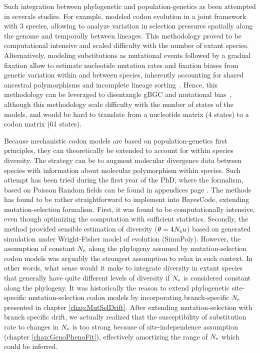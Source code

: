 Such integration between phylogenetic and population-genetics as been attempted in severals studies.
For example, \citet{Wilson2011} modeled codon evolution in a joint framework with $3$ species, allowing to analyze variation in selection pressures spatially along the genome and temporally between lineages.
This methodology proved to be computational intensive and scaled difficulty with the number of extant species.
Alternatively, modeling substitutions as mutational events followed by a gradual fixation allow to estimate nucleotide mutation rates and fixation biases from genetic variation within and between species, inherently accounting for shared ancestral polymorphisms and incomplete lineage sorting~\citep{DeMaio2013, Schrempf2016, Bergman2018, Schrempf2019}.
Hence, this methodology can be leveraged to disentangle gBGC and mutational bias~\citep{Borges2019, Borges2020}, although this methodology scale difficulty with the number of states of the models, and would be hard to translate from a nucleotide matrix (4 states) to a codon matrix (61 states).

Because mechanistic \gls{codon} models are based on population-genetics first principles, they can theoretically be extended to account for within species diversity.
The strategy can be to augment molecular divergence data between species with information about molecular polymorphism within species.
Such attempt has been tried during the first year of the PhD, where the formalism, based on Poisson Random fields can be found in appendices page \pageref{sec-appendix:PRF}.
The methods has found to be rather straightforward to implement into BayesCode, extending mutation-selection formalism.
First, it was found to be computationally intensive, even though optimizing the computation with sufficient statistics.
Secondly, the method provided sensible estimation of diversity ($\theta = 4 N_{\textrm{e}} u$) based on generated simulation under Wright-Fisher model of evolution (SimuPoly).
However, the assumption of constant $N_{\textrm{e}}$ along the phylogeny assumed by mutation-selection codon models was arguably the strongest assumption to relax in such context.
In other words, what sense would it make to integrate diversity in extant species that generally have quite different levels of diversity if $N_{\textrm{e}}$ is considered constant along the phylogeny.
It was historically the reason to extend phylogenetic site-specific mutation-selection \gls{codon} models by incorporating branch-specific $N_{\textrm{e}}$ presented in chapter \ref{chap:MutSelDrift}.
After extending mutation-selection with branch specific drift, we actually realized that the susceptibility of \gls{substitution} rate to changes in $N_{\textrm{e}}$ is too strong because of site-independence assumption (chapter \ref{chap:GenoPhenoFit}), effectively amortizing the range of $N_{\textrm{e}}$ which could be inferred.

